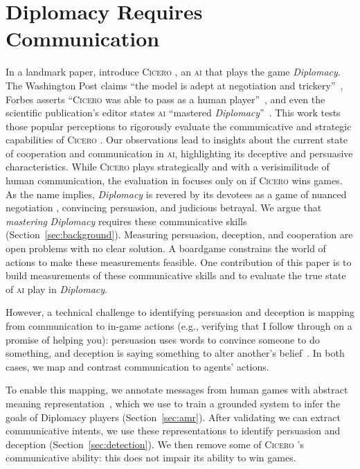 \documentclass[oneside]{memoir}
\newcommand{\cicero}{\abr{Cicero} }
\newcommand{\abr}[1]{\textsc{#1}}
\begin{document}
\section{Diplomacy Requires Communication}


In a landmark paper, \citet{meta2022human} introduce \cicero{}, an \abr{ai}
that plays the game \textit{Diplomacy}.
%
The Washington Post claims ``the model is adept at negotiation and
trickery''~\cite{washpost}, Forbes asserts ``\cicero{} was able to pass
as a human player''~\citep{forbes}, and even the scientific publication's editor
states \abr{ai} ``mastered
\textit{Diplomacy}''~\citep{meta2022human}.
%
This work tests those popular perceptions to 
rigorously evaluate the communicative and strategic capabilities of
\cicero{}.
%
Our observations lead to insights about the current state of
cooperation and communication in \abr{ai}, highlighting its deceptive
and persuasive characteristics.
%
While \cicero{} plays strategically and with a verisimilitude of human
communication, the evaluation in \citet{meta2022human} focuses only on
if \cicero{} wins games.
%
As the name implies, \textit{Diplomacy} is revered by its devotees as
a game of nuanced negotiation \citep{kraus1995designing}, convincing
persuasion, and judicious betrayal.
%
We argue that \emph{mastering} \textit{Diplomacy} requires these
communicative skills (Section~\ref{sec:background}).
%
Measuring persuasion, deception, and cooperation are open problems
with no clear solution.  A boardgame constrains the world of actions
to make these measurements feasible.
%
One contribution of this paper is to build measurements of these
communicative skills and to evaluate the true state of \abr{ai} play
in \textit{Diplomacy}.
%

However, a technical challenge to identifying persuasion and deception is
mapping from communication to in-game actions (e.g., verifying that I follow through on a promise of helping you):
%
persuasion uses words to convince someone to do something,
and deception is saying something to alter another's belief~\cite{chrisholm1977intent}.
%
In both cases, we map and contrast communication to agents' actions.

To enable this mapping, we annotate messages from human games with
abstract meaning
representation~\citep[\abr{amr},][]{banarescu-etal-2013-abstract},
which we use to train a grounded system to infer the goals of
Diplomacy players (Section~\ref{sec:amr}).
%
After validating we can extract communicative intents, we use these
representations to identify persuasion and deception
(Section~\ref{sec:detection}).
%
We then remove some of \cicero{}'s communicative ability: 
this does not impair its ability to win games.
\end{document}
